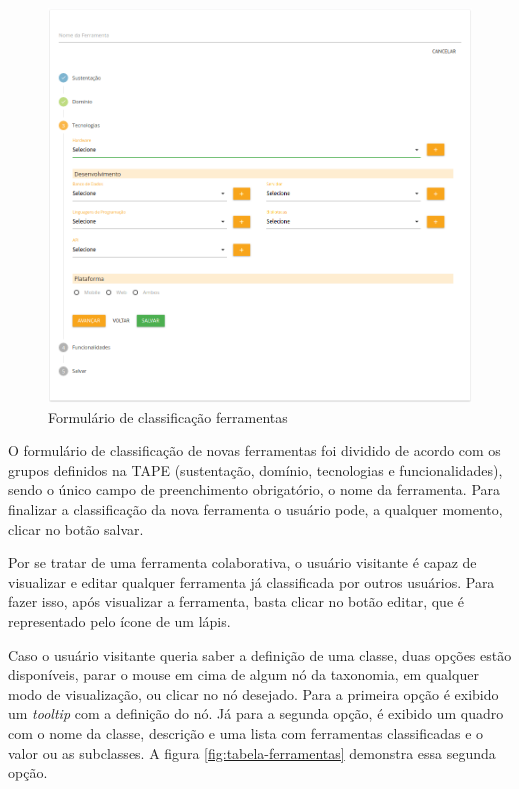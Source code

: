 \begin{figure}[!ht]
    \centering
    \includegraphics[scale=0.20]{./figuras/new-ferramenta.png}
    \caption{Formulário de classificação ferramentas}
    \label{fig:new-ferramenta}
\end{figure}


\par
O formulário de classificação de novas ferramentas foi dividido de acordo com os grupos definidos na TAPE (sustentação, domínio, tecnologias e funcionalidades), sendo o único campo de preenchimento obrigatório, o nome da ferramenta. Para finalizar a classificação da nova ferramenta o usuário pode, a qualquer momento, clicar no botão salvar. 
\par
Por se tratar de uma ferramenta colaborativa, o usuário visitante é capaz de visualizar e editar qualquer ferramenta já classificada por outros usuários. 
Para fazer isso, após visualizar a ferramenta, basta clicar no botão editar, que é representado pelo ícone de um lápis. 

\par
Caso o usuário visitante queria saber a definição de uma classe, duas opções estão disponíveis, parar o mouse em cima de algum nó da taxonomia, em qualquer modo de visualização, 
ou clicar no nó desejado. Para a primeira opção é exibido um \textit{tooltip} com a definição do nó. Já para a segunda opção, é exibido um quadro com o nome da classe, descrição e 
uma lista com ferramentas classificadas e o valor ou as subclasses. A figura \ref{fig:tabela-ferramentas} demonstra essa segunda opção. 

